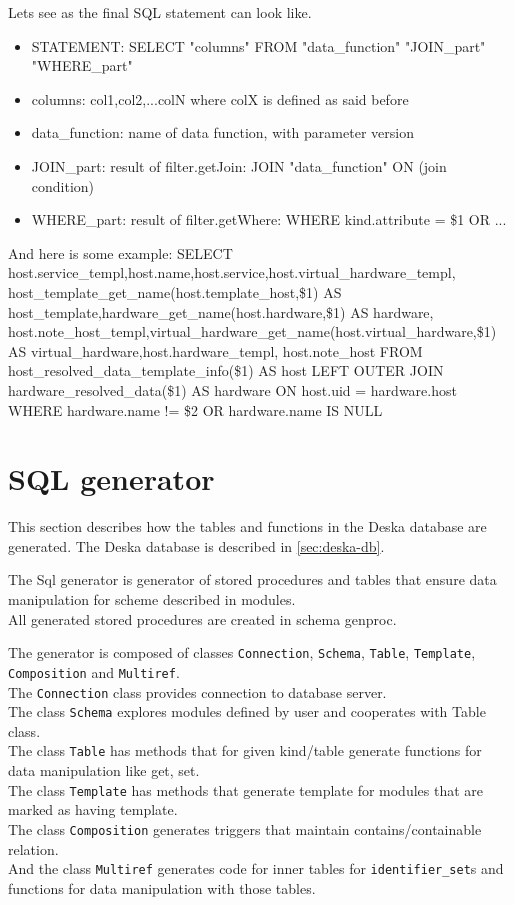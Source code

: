 \documentclass[deska]{subfiles}
\begin{document}
Lets see as the final SQL statement can look like.
\begin{itemize}
\item{STATEMENT}: SELECT "columns" FROM "data\_function" "JOIN\_part" "WHERE\_part"
\item{columns}: col1,col2,...colN where colX is defined as said before
\item{data\_function}: name of data function, with parameter version
\item{JOIN\_part}: result of filter.getJoin: JOIN "data\_function" ON (join condition)
\item{WHERE\_part}: result of filter.getWhere: WHERE kind.attribute = \$1 OR ...
\end{itemize}
And here is some example:
SELECT host.service\_templ,host.name,host.service,host.virtual\_hardware\_templ,
host\_template\_get\_name(host.template\_host,\$1) AS host\_template,hardware\_get\_name(host.hardware,\$1) AS hardware,
host.note\_host\_templ,virtual\_hardware\_get\_name(host.virtual\_hardware,\$1) AS virtual\_hardware,host.hardware\_templ,
host.note\_host FROM host\_resolved\_data\_template\_info(\$1) AS host
LEFT OUTER JOIN hardware\_resolved\_data(\$1) AS hardware ON host.uid = hardware.host
WHERE hardware.name != \$2 OR hardware.name IS NULL 

\section{SQL generator}
\label{sec:sql-generator}
This section describes how the tables and functions in the Deska database are generated. The Deska database is described in \ref{sec:deska-db}.

The Sql generator is generator of stored procedures and tables that ensure data manipulation for scheme described in modules.\\
All generated stored procedures are created in schema genproc.

The generator is composed of classes {\tt Connection}, {\tt Schema}, {\tt Table}, {\tt Template}, {\tt Composition} and {\tt Multiref}.\\
The {\tt Connection} class provides connection to database server.\\
The class {\tt Schema} explores modules defined by user and cooperates with Table class.\\
The class {\tt Table} has methods that for given kind/table generate functions for data manipulation like get, set.\\
The class {\tt Template} has methods that generate template for modules that are marked as having template.\\
The class {\tt Composition} generates triggers that maintain contains/containable relation.\\
And the class {\tt Multiref} generates code for inner tables for {\tt identifier\_set}s and functions for data manipulation with those tables.\\
\end{document}
